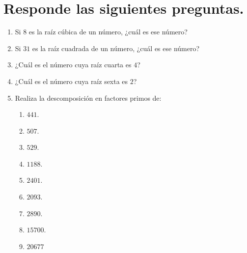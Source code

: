 \documentclass[14pt]{extarticle}
\begin{document}
\section{Responde las siguientes preguntas.}

\begin{enumerate}
\item Si $8$ es la raíz cúbica de un número, ¿cuál es ese número?
\item Si $31$ es la raíz cuadrada de un número, ¿cuál es ese número?
\item ¿Cuál es el número cuya raíz cuarta es $4$?
\item ¿Cuál es el número cuya raíz sexta es $2$?
\item Realiza la descomposición en factores primos de:
\begin{enumerate}
\item $441$.
\item $507$.
\item $529$.
\item $1188$.
\item $2401$.
\item $2093$.
\item $2890$.
\item $15700$.
\item $20677$
\end{enumerate}
\end{enumerate}
\end{document}
